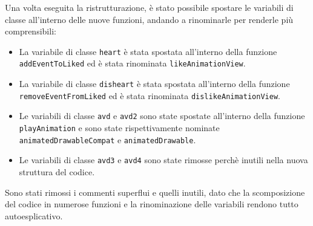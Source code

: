 Una volta eseguita la ristrutturazione, è stato possibile spostare le variabili di classe all'interno delle nuove funzioni, andando a rinominarle per renderle più comprensibili:
\begin{itemize}
    \item La variabile di classe \verb|heart| è stata spostata all'interno della funzione \verb|addEventToLiked| ed è stata rinominata \verb|likeAnimationView|.
    \item La variabile di classe \verb|disheart| è stata spostata all'interno della funzione \verb|removeEventFromLiked| ed è stata rinominata \verb|dislikeAnimationView|.
    \item Le variabili di classe \verb|avd| e \verb|avd2| sono state spostate all'interno della funzione \verb|playAnimation| e sono state rispettivamente nominate \verb|animatedDrawableCompat| e \verb|animatedDrawable|.
    \item Le variabili di classe \verb|avd3| e \verb|avd4| sono state rimosse perchè inutili nella nuova struttura del codice.
\end{itemize}
Sono stati rimossi i commenti superflui e quelli inutili, dato che la scomposizione del codice in numerose funzioni e la rinominazione delle variabili rendono tutto autoesplicativo.